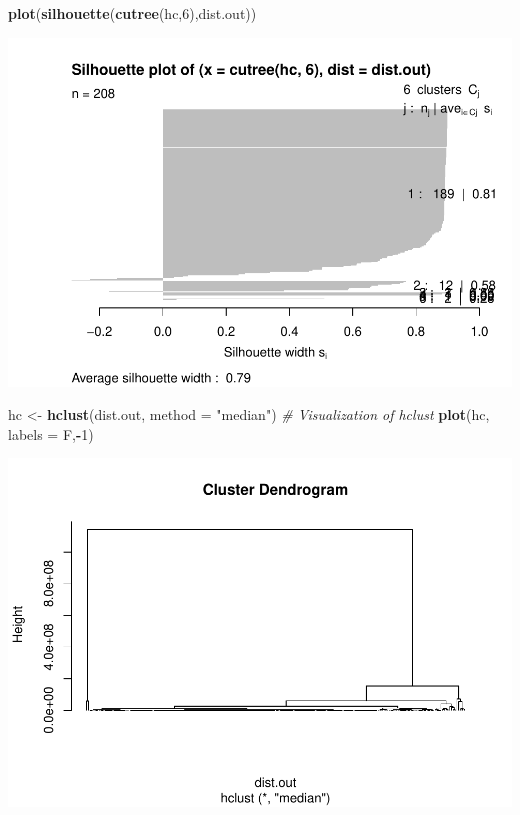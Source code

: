 \documentclass[
]{article}
\newenvironment{Shaded}{\begin{snugshade}}{\end{snugshade}}
\newcommand{\CommentTok}[1]{\textcolor[rgb]{0.56,0.35,0.01}{\textit{#1}}}
\newcommand{\DataTypeTok}[1]{\textcolor[rgb]{0.13,0.29,0.53}{#1}}
\newcommand{\DecValTok}[1]{\textcolor[rgb]{0.00,0.00,0.81}{#1}}
\newcommand{\KeywordTok}[1]{\textcolor[rgb]{0.13,0.29,0.53}{\textbf{#1}}}
\newcommand{\NormalTok}[1]{#1}
\newcommand{\OperatorTok}[1]{\textcolor[rgb]{0.81,0.36,0.00}{\textbf{#1}}}
\newcommand{\StringTok}[1]{\textcolor[rgb]{0.31,0.60,0.02}{#1}}
\begin{document}
\begin{Shaded}
\begin{Highlighting}[]
\KeywordTok{plot}\NormalTok{(}\KeywordTok{silhouette}\NormalTok{(}\KeywordTok{cutree}\NormalTok{(hc,}\DecValTok{6}\NormalTok{),dist.out))}
\end{Highlighting}
\end{Shaded}

\includegraphics{Assignment1_files/figure-latex/unnamed-chunk-26-8.pdf}

\begin{Shaded}
\begin{Highlighting}[]
\NormalTok{hc <-}\StringTok{ }\KeywordTok{hclust}\NormalTok{(dist.out,}
             \DataTypeTok{method =} \StringTok{"median"}\NormalTok{)}
\CommentTok{# Visualization of hclust}
\KeywordTok{plot}\NormalTok{(hc, }\DataTypeTok{labels =}\NormalTok{ F,}\OperatorTok{-}\DecValTok{1}\NormalTok{)}
\end{Highlighting}
\end{Shaded}

\includegraphics{Assignment1_files/figure-latex/unnamed-chunk-26-9.pdf}
\end{document}
